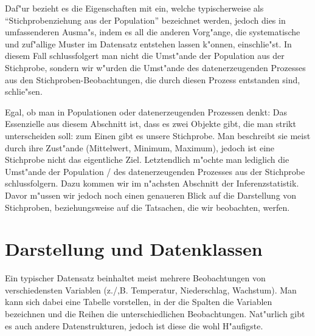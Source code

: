 \documentclass[a4paper,twoside]{tufte-book}\usepackage[]{graphicx}\usepackage[]{color}
\begin{document}
  Daf"ur bezieht es die Eigenschaften mit ein, welche typischerweise als "`Stichprobenziehung aus der Population"' bezeichnet werden, jedoch dies in umfassenderen Ausma"s, indem es all die anderen Vorg"ange, die systematische und zuf"allige Muster im Datensatz entstehen lassen k"onnen, einschlie"st. In diesem Fall schlussfolgert man nicht die Umst"ande der Population aus der Stichprobe, sondern wir w"urden die Umst"ande des datenerzeugenden Prozesses aus den Stichproben-Beobachtungen, die durch diesen Prozess entstanden sind, schlie"sen. 

Egal, ob man in Populationen oder datenerzeugenden Prozessen denkt: Das Essenzielle aus diesem Abschnitt ist, dass es zwei Objekte gibt, die man strikt unterscheiden soll: zum Einen gibt es unsere Stichprobe. Man beschreibt sie meist durch ihre Zust"ande (Mittelwert, Minimum, Maximum), jedoch ist eine Stichprobe nicht das eigentliche Ziel. Letztendlich m"ochte man lediglich die Umst"ande der Population / des datenerzeugenden Prozesses aus der Stichprobe schlussfolgern. Dazu kommen wir im n"achsten Abschnitt der Inferenzstatistik. Davor m"ussen wir jedoch noch einen genaueren Blick auf die Darstellung von Stichproben, beziehungsweise auf die Tatsachen, die wir beobachten, werfen.

\section{Darstellung und Datenklassen}

Ein typischer Datensatz beinhaltet meist mehrere Beobachtungen von verschiedensten Variablen (z./,B. Temperatur, Niederschlag, Wachstum). Man kann sich dabei eine Tabelle vorstellen, in der die Spalten die Variablen bezeichnen und die Reihen die unterschiedlichen Beobachtungen. Nat"urlich gibt es auch andere Datenstrukturen, jedoch ist diese die wohl H"aufigste.
\end{document}
